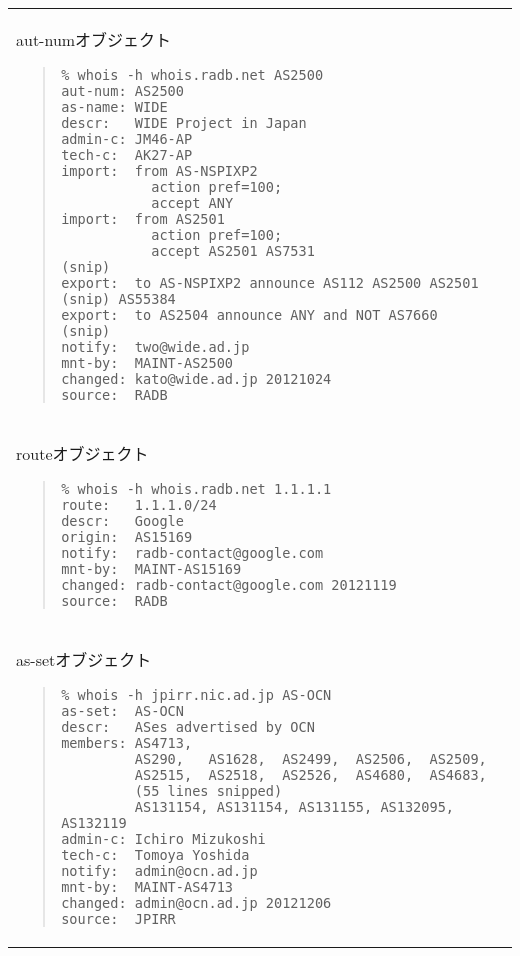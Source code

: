 \begin{tabular}{l}
\begin{itembox}[c]{aut-numオブジェクト}
\begin{quote}
\begin{minilinespace}
\begin{verbatim}
% whois -h whois.radb.net AS2500 
aut-num: AS2500
as-name: WIDE
descr:   WIDE Project in Japan
admin-c: JM46-AP
tech-c:  AK27-AP
import:  from AS-NSPIXP2
           action pref=100;
           accept ANY
import:  from AS2501
           action pref=100;
           accept AS2501 AS7531                     
(snip)
export:  to AS-NSPIXP2 announce AS112 AS2500 AS2501 (snip) AS55384
export:  to AS2504 announce ANY and NOT AS7660      
(snip)
notify:  two@wide.ad.jp
mnt-by:  MAINT-AS2500
changed: kato@wide.ad.jp 20121024
source:  RADB
\end{verbatim}
\end{minilinespace}
\end{quote}
\end{itembox}
\\
\begin{itembox}[c]{routeオブジェクト}
\begin{quote}
\begin{minilinespace}
\begin{verbatim}
% whois -h whois.radb.net 1.1.1.1
route:   1.1.1.0/24
descr:   Google
origin:  AS15169
notify:  radb-contact@google.com
mnt-by:  MAINT-AS15169
changed: radb-contact@google.com 20121119
source:  RADB
\end{verbatim}
\end{minilinespace}
\end{quote}
\end{itembox}
\\
\begin{itembox}[c]{as-setオブジェクト}
\begin{quote}
\begin{minilinespace}
\begin{verbatim}
% whois -h jpirr.nic.ad.jp AS-OCN
as-set:  AS-OCN
descr:   ASes advertised by OCN
members: AS4713,
         AS290,   AS1628,  AS2499,  AS2506,  AS2509,
         AS2515,  AS2518,  AS2526,  AS4680,  AS4683,
         (55 lines snipped)
         AS131154, AS131154, AS131155, AS132095, AS132119
admin-c: Ichiro Mizukoshi
tech-c:  Tomoya Yoshida
notify:  admin@ocn.ad.jp
mnt-by:  MAINT-AS4713
changed: admin@ocn.ad.jp 20121206
source:  JPIRR
\end{verbatim}
\end{minilinespace}
\end{quote}
\end{itembox}

\end{tabular}

